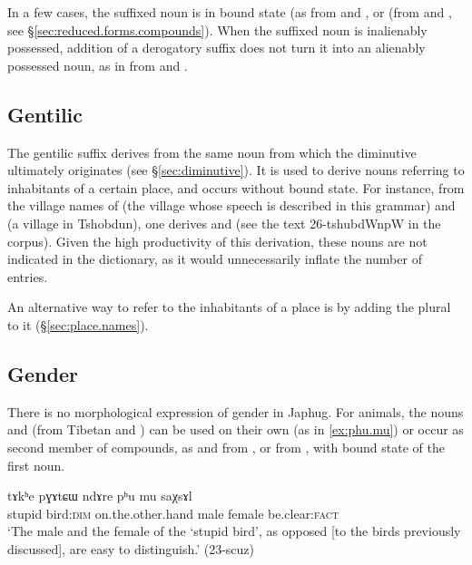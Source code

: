  In a few cases, the suffixed noun is in bound state (as  from  and , or  (from  and , see §\ref{sec:reduced.forms.compounds}). When the suffixed noun is inalienably possessed, addition of a derogatory suffix does not turn it into an alienably possessed noun, as in  from  and .

\subsection{Gentilic} \label{ex:gentilic.pW}
The gentilic suffix  derives from the same noun  from which the diminutive  ultimately originates (see §\ref{sec:diminutive}). It is used to derive nouns referring to inhabitants of a certain place, and occurs without bound state. For instance, from the village names of  (the village whose speech is described in this grammar) and  (a village in Tshobdun), one derives  and  (see the text 26-tshubdWnpW in the corpus). Given the high productivity of this derivation, these nouns are not indicated in the dictionary, as it would unnecessarily inflate the number of entries.

An alternative way to refer to the inhabitants of a place is by adding the plural  to it (§\ref{sec:place.names}).

\subsection{Gender} \label{sec:gender}
There is no morphological expression of gender in Japhug. For animals, the nouns  and  (from Tibetan  and ) can be used on their own (as in \ref{ex:phu.mu}) or occur as second member of compounds, as  and  from , or  from , with bound state of the first noun.

\begin{exe}
\ex \label{ex:phu.mu}
\gll tɤkʰe pɣɤtɕɯ ndɤre pʰu mu saχsɤl \\
stupid bird:\textsc{dim} on.the.other.hand male female be.clear:\textsc{fact} \\
\glt `The male and the female of the `stupid bird', as opposed [to the birds previously discussed], are easy to distinguish.' (23-scuz)
\end{exe}

